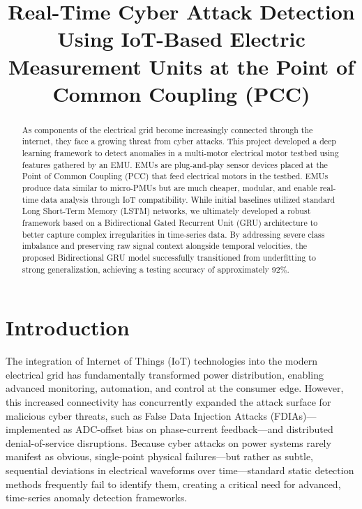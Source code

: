 \documentclass[conference,onecolumn,letterpaper,romanappendices,12pt,english,nofonttune]{IEEEtran}
\begin{document}

\title{Real-Time Cyber Attack Detection Using IoT-Based Electric Measurement Units at the Point of Common Coupling (PCC)}
\maketitle

\begin{abstract}
As components of the electrical grid become increasingly connected through the internet, they face a growing threat from cyber attacks. This project developed a deep learning framework to detect anomalies in a multi-motor electrical motor testbed using features gathered by an EMU. EMUs are plug-and-play sensor devices placed at the Point of Common Coupling (PCC) that feed electrical motors in the testbed. EMUs produce data similar to micro-PMUs but are much cheaper, modular, and enable real-time data analysis through IoT compatibility. While initial baselines utilized standard Long Short-Term Memory (LSTM) networks, we ultimately developed a robust framework based on a Bidirectional Gated Recurrent Unit (GRU) architecture to better capture complex irregularities in time-series data. By addressing severe class imbalance and preserving raw signal context alongside temporal velocities, the proposed Bidirectional GRU model successfully transitioned from underfitting to strong generalization, achieving a testing accuracy of approximately 92\%.
\end{abstract}

\section{Introduction}
The integration of Internet of Things (IoT) technologies into the modern electrical grid has fundamentally transformed power distribution, enabling advanced monitoring, automation, and control at the consumer edge. However, this increased connectivity has concurrently expanded the attack surface for malicious cyber threats, such as False Data Injection Attacks (FDIAs)—implemented as ADC-offset bias on phase-current feedback—and distributed denial-of-service disruptions. Because cyber attacks on power systems rarely manifest as obvious, single-point physical failures—but rather as subtle, sequential deviations in electrical waveforms over time—standard static detection methods frequently fail to identify them, creating a critical need for advanced, time-series anomaly detection frameworks.
\end{document}
